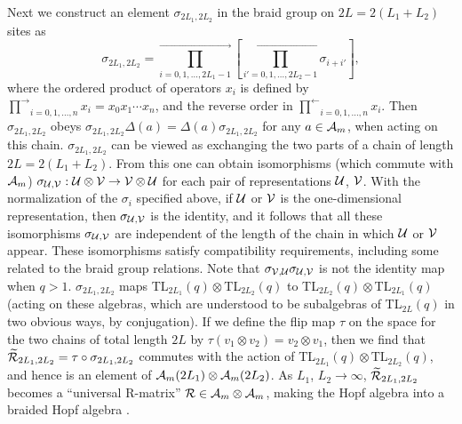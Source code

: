 \documentclass[twocolumn,floats,pra]{revtex4}
\def \cA {{\cal A}}
\newcommand {\be}{\begin{equation}}
\newcommand {\ee} {\end{equation}}
\begin{document}
Next we construct an element
$\sigma_{2L_1,2L_2}$ in the braid group on $2L=2(L_1+L_2)$ sites as%
\be
\sigma_{2L_1,2L_2}=\stackrel{\rightarrow}{\prod_{i=0,1,\ldots,2L_1-1}}
\left[\stackrel{\leftarrow}{\prod_{i'=0,1,\ldots,2L_2-1}}
\sigma_{i+i'}\right],\ee %
where the ordered product of operators $x_i$ is defined by
$\stackrel{\rightarrow}{\prod}_{i=0,1,\ldots,n}x_i=x_0x_1\cdots
x_n$, and the reverse order in
$\stackrel{\leftarrow}{\prod}_{i=0,1,\ldots,n}x_i$. Then
$\sigma_{2L_1,2L_2}$ obeys
$\sigma_{2L_1,2L_2}\Delta(a)=\Delta(a)\sigma_{2L_1,2L_2}$ for any
$a\in \cA_m$, when acting on this chain. $\sigma_{2L_1,2L_2}$ can
be viewed as exchanging the two parts of a chain of length
$2L=2(L_1+L_2)$. From this one can obtain isomorphisms (which
commute with $\cA_m$) $\sigma_{{\cal U},{\cal V}}:{\cal
U}\otimes{\cal V}\to{\cal V}\otimes{\cal U}$ for each pair of
representations ${\cal U}$, ${\cal V}$. With the normalization of
the $\sigma_i$ specified above, if $\cal U$ or $\cal V$ is the
one-dimensional representation, then $\sigma_{{\cal U},{\cal V}}$
is the identity, and it follows that all these isomorphisms
$\sigma_{{\cal U},{\cal V}}$ are independent of the length of the
chain in which $\cal U$ or $\cal V$ appear. These isomorphisms
satisfy compatibility requirements, including some related to the
braid group relations. Note that $\sigma_{{\cal V},{\cal
U}}\sigma_{{\cal U},{\cal V}}$ is not the identity map when $q>1$.
$\sigma_{2L_1,2L_2}$ maps TL$_{2L_1}(q)\otimes$TL$_{2L_2}(q)$ to
TL$_{2L_2}(q)\otimes$TL$_{2L_1}(q)$ (acting on these algebras,
which are understood to be subalgebras of TL$_{2L}(q)$ in two
obvious ways, by conjugation). If we define the flip map $\tau$ on
the space for the two chains of total length $2L$ by
$\tau(v_1\otimes v_2)=v_2\otimes v_1$, then we find that
$\widetilde{\cal R}_{2L_1,2L_2}= \tau\circ\sigma_{2L_1,2L_2}$
commutes with the action of TL$_{2L_1}(q)\otimes$TL$_{2L_2}(q)$,
and hence is an element of $\cA_m(2L_1)\otimes\cA_m(2L_2)$. As
$L_1$, $L_2\to\infty$, $\widetilde{\cal R}_{2L_1,2L_2}$ becomes a
``universal R-matrix'' ${\cal R}\in \cA_m\otimes\cA_m$, making the
Hopf algebra into a braided Hopf algebra \cite{cp,kass}.
\end{document}
